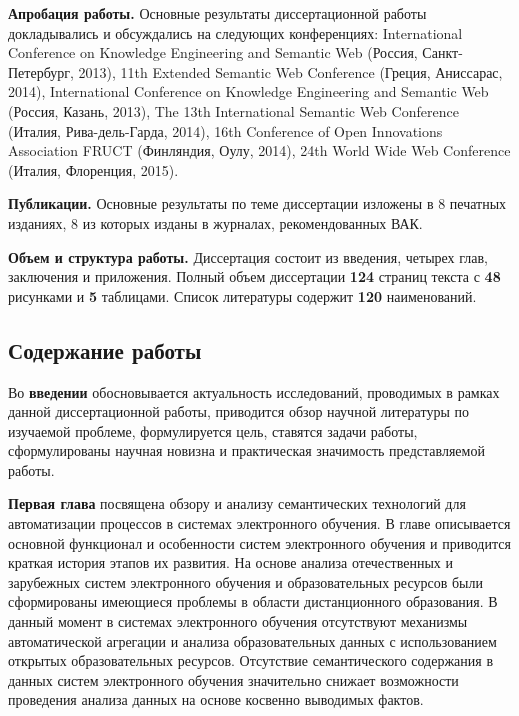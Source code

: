  


\textbf{Апробация работы.}
Основные результаты диссертационной работы докладывались и обсуждались на следующих конференциях:
International Conference on Knowledge Engineering and Semantic Web (Россия, Санкт-Петербург, 2013),
11th Extended Semantic Web Conference (Греция, Аниссарас, 2014), International Conference on Knowledge Engineering and Semantic Web (Россия, Казань, 2013), The 13th International Semantic Web Conference (Италия, Рива-дель-Гарда, 2014), 16th Conference of Open
Innovations Association FRUCT (Финляндия, Оулу, 2014), 24th World Wide Web Conference (Италия, Флоренция, 2015).

\textbf{Публикации.} Основные результаты по теме диссертации изложены в 8 печатных изданиях, 8 из которых изданы в журналах, рекомендованных ВАК.

\textbf{Объем и структура работы.} Диссертация состоит из введения, четырех глав, заключения и приложения. Полный объем диссертации \textbf{124} страниц текста с \textbf{48} рисунками и \textbf{5} таблицами. Список литературы содержит \textbf{120} наименований.

\subsection*{\Large Содержание работы}
Во \textbf{введении} обосновывается актуальность исследований, проводимых в рамках данной диссертационной работы, приводится обзор научной литературы по изучаемой проблеме, формулируется цель, ставятся задачи работы, сформулированы научная новизна и практическая значимость представляемой работы.

\textbf{Первая глава} посвящена обзору и анализу семантических технологий для автоматизации процессов в системах электронного обучения. В главе описывается основной функционал и особенности систем электронного обучения и приводится краткая история этапов их развития. На основе анализа отечественных и зарубежных систем электронного обучения и образовательных ресурсов были сформированы имеющиеся проблемы в области дистанционного образования. В данный момент в системах электронного обучения отсутствуют механизмы автоматической агрегации и анализа образовательных данных с использованием открытых образовательных ресурсов. Отсутствие семантического содержания в данных систем электронного обучения значительно снижает возможности проведения анализа данных на основе косвенно выводимых фактов.

